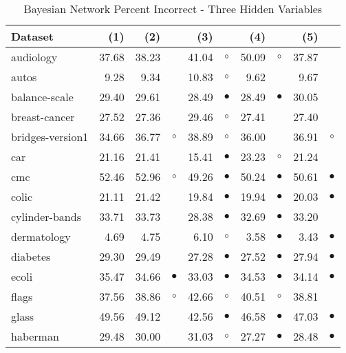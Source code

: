 \newpage
{\centering \footnotesize \begin{longtable}{lrr@{\hspace{0.1cm}}cr@{\hspace{0.1cm}}cr@{\hspace{0.1cm}}cr@{\hspace{0.1cm}}c}
\caption{\label{bnpi3}Bayesian Network Percent Incorrect - Three Hidden Variables}
\\
\hline
Dataset & (1)& (2) & & (3) & & (4) & & (5) & \\
\hline
audiology & 37.68 & 38.23 &           & 41.04 &   $\circ$ & 50.09 &   $\circ$ & 37.87 &          \\
autos &  9.28 &  9.34 &           & 10.83 &   $\circ$ &  9.62 &           &  9.67 &          \\
balance-scale & 29.40 & 29.61 &           & 28.49 & $\bullet$ & 28.49 & $\bullet$ & 30.05 &          \\
breast-cancer & 27.52 & 27.36 &           & 29.46 &   $\circ$ & 27.41 &           & 27.40 &          \\
bridges-version1 & 34.66 & 36.77 &   $\circ$ & 38.89 &   $\circ$ & 36.00 &           & 36.91 &   $\circ$\\
car & 21.16 & 21.41 &           & 15.41 & $\bullet$ & 23.23 &   $\circ$ & 21.24 &          \\
cmc & 52.46 & 52.96 &   $\circ$ & 49.26 & $\bullet$ & 50.24 & $\bullet$ & 50.61 & $\bullet$\\
colic & 21.11 & 21.42 &           & 19.84 & $\bullet$ & 19.94 & $\bullet$ & 20.03 & $\bullet$\\
cylinder-bands & 33.71 & 33.73 &           & 28.38 & $\bullet$ & 32.69 & $\bullet$ & 33.20 &          \\
dermatology &  4.69 &  4.75 &           &  6.10 &   $\circ$ &  3.58 & $\bullet$ &  3.43 & $\bullet$\\
diabetes & 29.30 & 29.49 &           & 27.28 & $\bullet$ & 27.52 & $\bullet$ & 27.94 & $\bullet$\\
ecoli & 35.47 & 34.66 & $\bullet$ & 33.03 & $\bullet$ & 34.53 & $\bullet$ & 34.14 & $\bullet$\\
flags & 37.56 & 38.86 &   $\circ$ & 42.66 &   $\circ$ & 40.51 &   $\circ$ & 38.81 &          \\
glass & 49.56 & 49.12 &           & 42.56 & $\bullet$ & 46.58 & $\bullet$ & 47.03 & $\bullet$\\
haberman & 29.48 & 30.00 &           & 31.03 &   $\circ$ & 27.27 & $\bullet$ & 28.48 & $\bullet$\\

\end{longtable}}
